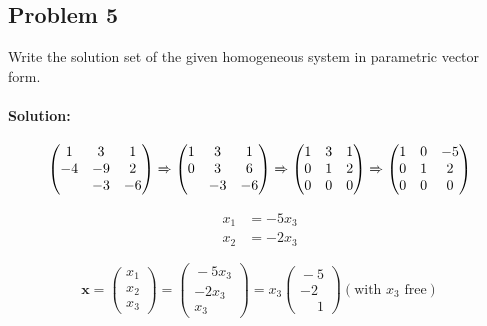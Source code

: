 \documentclass[11pt, notitlepage]{report}
\newenvironment{solution}{\paragraph{\small Solution:}}{\hfill}
\begin{document}
\subsection{Problem 5}

Write the solution set of the given homogeneous system in parametric vector form.

\begin{solution}

\[
\left(\begin{matrix}{}
  1& 3& 1\\
  -4&-9 &2 \\
    &-3 &-6
\end{matrix}\right)
%
\xRightarrow{}
%
\left(\begin{matrix}{}
  1 & 3 & 1\\
  0 & 3 & 6 \\
    &-3 &-6
\end{matrix}\right)
%
\xRightarrow{}
%
\left(\begin{matrix}{}
  1 & 3 & 1\\
  0 & 1 & 2 \\
  0 &0 &0
\end{matrix}\right)
%
\xRightarrow{}
%
\left(\begin{matrix}{}
  1 & 0 & -5\\
  0 & 1 & 2 \\
  0 &0 &0
\end{matrix}\right)
\]

\begin{align*}
x_1 &= -5x_3 \\
x_2 &= -2x_3
\end{align*}

\[
\textbf{x}= \left(\begin{matrix}{}
  x_1\\
  x_2\\
  x_3
\end{matrix}\right)
= \left(\begin{matrix}{}
  -5x_3\\
  -2x_3\\
  x_3
\end{matrix}\right)
= x_3
\left(\begin{matrix}{}
  -5 \\
  -2 \\
  \phantom{-}1
\end{matrix}\right) (\text{with $x_3$ free})
\]


\end{solution}
\end{document}
